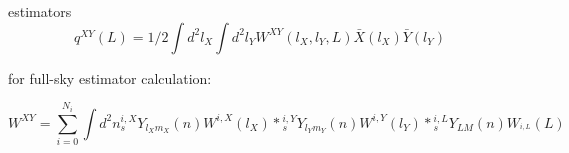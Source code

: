 \documentclass[12pt]{article}
\begin{document}
estimators
\begin{equation}
  q^{XY}(L) = 1/2 \int{d^2 l_X} \int{d^2 l_Y}
                    W^{XY}(l_X, l_Y, L) \bar{X}(l_X) \bar{Y}(l_Y)
\end{equation}

for full-sky estimator calculation:

\begin{equation}
  W^{XY} = \sum_{i=0}^{N_i} \int{d^2 n}
                    {}_s^{i,X}Y_{l_X m_X}(n) W^{i,X}(l_X) *
                     {}_s^{i,Y}Y_{l_Y m_Y}(n) W^{i,Y}(l_Y) *
                      {}_s^{i,L}Y_{  L M  }(n) W_^{i,L}( L )
\end{equation}
\end{document}
